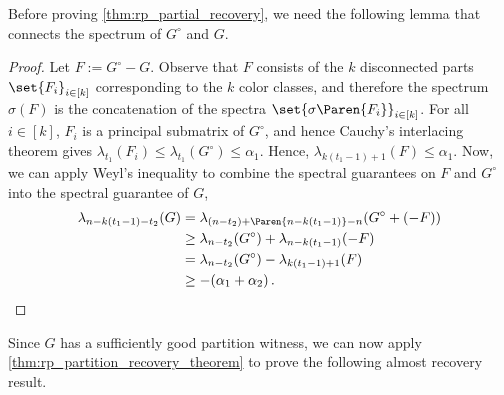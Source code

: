 Before proving \cref{thm:rp_partial_recovery}, we need the following lemma that connects the spectrum of $G^{\circ}$ and $G$.

    
    \begin{proof}
        Let $F:= G^{\circ} - G$.
        Observe that $F$ consists of the $k$ disconnected parts $\set{F_{i}}_{i \in [k]}$ corresponding to the $k$ color classes, and therefore the spectrum $\sigma(F)$ is the concatenation of the spectra $\set{\sigma\Paren{F_{i}}}_{i \in [k]}$.
        For all $i\in [k]$, $F_i$ is a principal submatrix of $G^{\circ}$, and hence Cauchy's interlacing theorem gives $\lambda_{t_1}(F_i) \leq \lambda_{t_1}(G^{\circ}) \leq \alpha_1$. Hence, $\lambda_{k(t_1-1)+1}(F)\leq \alpha_1$.
        Now, we can apply Weyl's inequality to combine the spectral guarantees on $F$ and $G^{\circ}$ into the spectral guarantee of $G$,
        \begin{align*}
            \lambda_{n-k(t_1-1)-t_2}(G)
            &=\lambda_{(n-t_2)+\Paren{n-k(t_1-1)}-n}(G^{\circ}+(-F))\\
            &\geq \lambda_{n-t_2}(G^{\circ})+\lambda_{n-k(t_1-1)}(-F)\\
            &= \lambda_{n-t_2}(G^{\circ})-\lambda_{k(t_1-1)+1}(F)\\
            &\geq -(\alpha_1+\alpha_2)\,.
        \end{align*}
    \end{proof}

Since $G$ has a sufficiently good partition witness, we can now apply \cref{thm:rp_partition_recovery_theorem} to prove the following almost recovery result.

